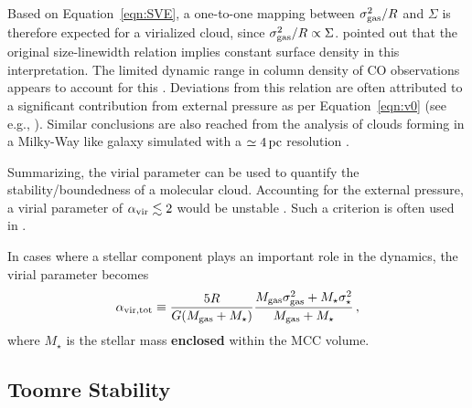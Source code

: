\IfFileExists{emulateapjlegacy.cls}{\documentclass[iop]{emulateapjlegacy}}{\documentclass[iop]{emulateapj}}
\begin{document}
Based on Equation~\ref{eqn:SVE}, a one-to-one mapping between $\sigma_{\rm gas}^2/R$ and $\Sigma$ is therefore expected for a virialized cloud, since $\sigma_{\rm gas}^2/R\propto\Sigma$.
%
\citep{Heyer09a} pointed out that the original size-linewidth relation implies constant surface density in this interpretation. The limited dynamic range in column density of CO observations appears to account for this \citep[see also][]{Ballesteros-Paredes11a}.
%
Deviations from this relation are often attributed to a significant contribution from external pressure as per Equation~\ref{eqn:v0} (see e.g., \citealt{Heyer09a, Hughes10a, Hughes13b, Meidt13a}). Similar conclusions are also reached from the
analysis of clouds forming in a Milky-Way like galaxy simulated with a $\simeq 4\,{\rm pc}$ resolution \citep[i.e.,][]{grisdale:2018}.

Summarizing, the virial parameter can be used to quantify the stability/boundedness of a molecular cloud. Accounting for the external pressure, a virial parameter of $\alpha_{\rm vir}\lesssim2$ would be unstable \citep{Bertoldi92b}. Such a criterion is often used in \obs \citep[see e.g., ][]{Kauffmann17b}.

In cases where a stellar component plays an important role in the dynamics, the virial parameter becomes
\begin{equation}
\alpha_{\rm vir, tot} \equiv \frac{5 R}{G (M_{\rm gas} + M_{\star})} \frac{M_{\rm gas} \sigma_{\rm gas}^2 + M_{\star} \sigma_\star^2}
					       {M_{\rm gas} + M_{\star} }\,,
\label{eqn:alpha_tot}
\end{equation}
where $M_\star$ is the stellar mass {\bf enclosed} within the MCC volume.

\subsection{Toomre Stability}\label{sec:Q}
\end{document}
